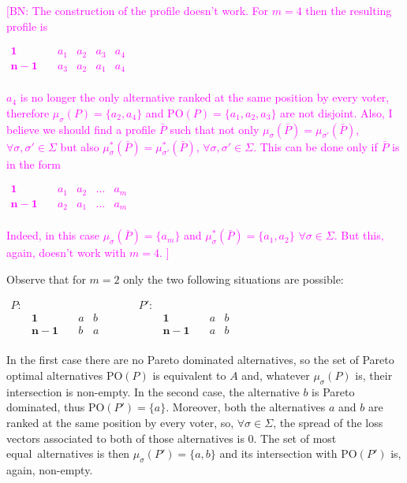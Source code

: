 \documentclass[version=3.21, pagesize, notitlepage, twoside=off, bibliography=totoc, DIV=calc, fontsize=11pt, a4paper]{scrartcl}
\newcommand{\commentBN}[1]{\textcolor{magenta}{\small$\big[$BN: #1$\big]$}}
\newcommand{\paretopt}{\text{PO}}
\newcommand{\musigma}{\mu_{\sigma}}
\newcommand{\mustar}{\mu_{\sigma}^*}
\begin{document}
	\commentBN{The construction of the profile doesn't work. For $m=4$ then the resulting profile is 
		\begin{center}
			$
			\begin{array}{ccccc}
			\mathbf{1} \quad &a_1&a_2&a_3&a_4\\
			\mathbf{n-1} \quad &a_3&a_2&a_1&a_4\\
			\end{array}
			$
		\end{center}
	 $a_4$ is no longer the only alternative ranked at the same position by every voter, therefore $\musigma(P)=\{a_2,a_4\}$ and $\paretopt(P)=\{a_1,a_2,a_3\}$ are not disjoint.
	 Also, I believe we should find a profile $\bar{P}$ such that not only $\musigma(\bar{P})=\mu_{\sigma'}(\bar{P})$, $\forall \sigma, \sigma' \in \Sigma$ but also $\mustar(\bar{P})=\mu^*_{\sigma'}(\bar{P})$, $\forall \sigma, \sigma' \in \Sigma$. This can be done only if $\bar{P}$ is in the form 
	 \begin{center}
	 	$
	 	\begin{array}{ccccc}
	 	\mathbf{1} \quad &a_1&a_2&\dots&a_m\\
	 	\mathbf{n-1} \quad &a_2&a_1&\dots&a_m\\
	 	\end{array}
	 	$
	 \end{center}
	 Indeed, in this case $\musigma(\bar{P})=\{a_m\}$ and $\mustar(\bar{P})=\{a_1,a_2\}$ $\forall \sigma \in \Sigma$. But this, again, doesn't work with $m=4$.
	}
\begin{note}
	Observe that for $m=2$ only the two following situations are possible:
	\begin{center}
		$
		\begin{array}{ccccccccc}
		P:&&&&&P':&&&\\
		&\mathbf{1} \quad &a&b&  \qquad &&\mathbf{1} \quad &a&b\\
		&\mathbf{n-1} \quad &b&a& \qquad &&\mathbf{n-1} \quad &a&b\\
		\end{array}
		$
	\end{center}
	In the first case there are no Pareto dominated alternatives, so the set of Pareto optimal alternatives $\paretopt(P)$ is equivalent to $A$ and, whatever $\musigma(P)$ is, their intersection is non-empty. In the second case, the alternative $b$ is Pareto dominated, thus $\paretopt(P')=\{a\}$. Moreover, both the alternatives $a$ and $b$ are ranked at the same position by every voter, so, $\forall \sigma \in \Sigma$, the spread of the loss vectors associated to both of those alternatives is $0$. The set of \oquot most equal\cquot \ alternatives is then $\musigma(P')=\{a,b\}$ and its intersection with $\paretopt(P')$ is, again, non-empty.
\end{note}
\end{document}
